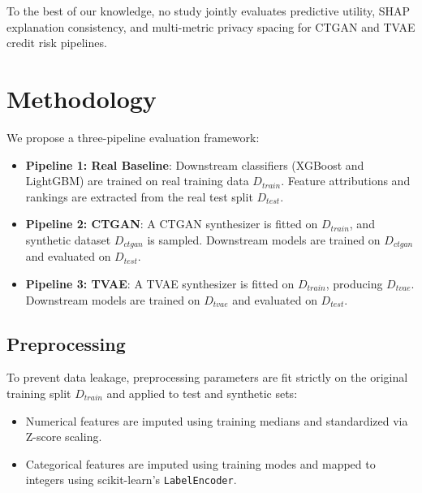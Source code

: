 \documentclass[journal]{IEEEtran}
\begin{document}
To the best of our knowledge, no study jointly evaluates predictive utility, SHAP explanation consistency, and multi-metric privacy spacing for CTGAN and TVAE credit risk pipelines.

\section{Methodology}
\label{sec:methodology}
We propose a three-pipeline evaluation framework:
\begin{itemize}
    \item \textbf{Pipeline 1: Real Baseline}: Downstream classifiers (XGBoost and LightGBM) are trained on real training data $D_{train}$. Feature attributions and rankings are extracted from the real test split $D_{test}$.
    \item \textbf{Pipeline 2: CTGAN}: A CTGAN synthesizer is fitted on $D_{train}$, and synthetic dataset $D_{ctgan}$ is sampled. Downstream models are trained on $D_{ctgan}$ and evaluated on $D_{test}$.
    \item \textbf{Pipeline 3: TVAE}: A TVAE synthesizer is fitted on $D_{train}$, producing $D_{tvae}$. Downstream models are trained on $D_{tvae}$ and evaluated on $D_{test}$.
\end{itemize}

\subsection{Preprocessing}
To prevent data leakage, preprocessing parameters are fit strictly on the original training split $D_{train}$ and applied to test and synthetic sets:
\begin{itemize}
    \item Numerical features are imputed using training medians and standardized via Z-score scaling.
    \item Categorical features are imputed using training modes and mapped to integers using scikit-learn's \texttt{LabelEncoder}.
\end{itemize}
\end{document}

